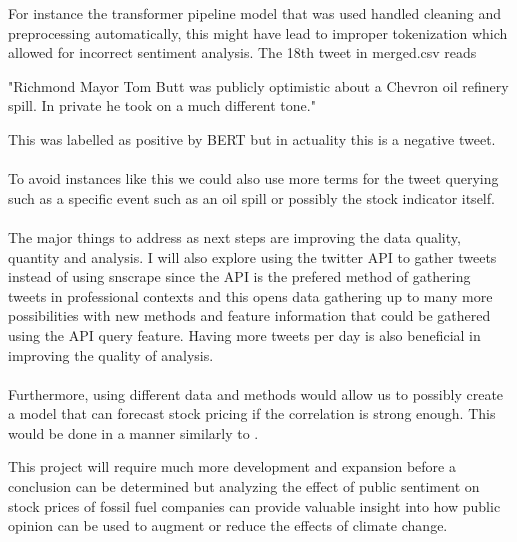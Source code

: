 \documentclass[12pt, letterpaper, titlepage]{article}
\begin{document}
	For instance the transformer pipeline model that was used handled cleaning and preprocessing automatically, this might have lead to improper tokenization which allowed for incorrect sentiment analysis. The 18th tweet in merged.csv reads 
	
	"Richmond Mayor Tom Butt was publicly optimistic about a Chevron oil refinery spill. In private he took on a much different tone." 
	
	This was labelled as positive by BERT but in actuality this is a negative tweet.
\paragraph{}
	To avoid instances like this we could also use more terms for the tweet querying such as a specific event such as an oil spill or possibly the stock indicator itself. 

\paragraph{}
The major things to address as next steps are improving the data quality, quantity and analysis. I will also explore using the twitter API to gather tweets instead of using snscrape since the API is the prefered method of gathering tweets in professional contexts and this opens data gathering up to many more possibilities with new methods and feature information that could be gathered using the API query feature.  Having more tweets per day is also beneficial in improving the quality of analysis. 

\paragraph{}
Furthermore, using different data and methods would allow us to possibly create a model that can forecast stock pricing if the correlation is strong enough. This would be done in a manner similarly to \cite{zhao2019forecasting}. 

This project will require much more development and expansion before a conclusion  can be determined but analyzing the effect of public sentiment on stock prices of fossil fuel companies can provide valuable insight into how public opinion can be used to augment or reduce the effects of climate change.
\bigskip
\bigskip
\bigskip
\bigskip
\bigskip
\bigskip
\bigskip
\bigskip
\bigskip
\bigskip
\bigskip
\bigskip
\bigskip
\bigskip
\bigskip
\bigskip
\bigskip
\bigskip
\bigskip
\bigskip
\bigskip
\bigskip
\bigskip
\bigskip


\end{document}
